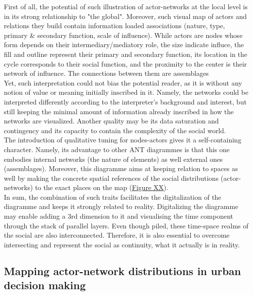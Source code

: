 \documentclass[11pt]{report}
\begin{document}
First of all, the potential of such illustration of actor-networks at the local level is in its strong relationship to "the global".
Moreover, such visual map of actors and relations they build contain information loaded associations (nature, type, primary \& secondary function, scale of influence).
While actors are nodes whose form depends on their intermediary/mediatory role, the size indicate influce, the fill and outline represent their primary and secondary function, its location in the cycle corresponds to their social function, and the proximity to the center is their network of influence.
The connections between them are assemblages
\\

Yet, such interpretation could not bias the potential reader, as it is without any notion of value or meaning initially inscribed in it.
Namely, the networks could be interpreted differently according to the interpreter's background and interest, but still keeping the minimal amount of information already inscribed in how the networks are visualized.
Another quality may be its data saturation and contingency and its capacity to contain the complexity of the social world.
\\

The introduction of qualitative tuning for nodes-actors gives it a self-containing character.
Namely, its advantage to other ANT diagrammes is that this one embodies internal  networks (the nature of elements) as well external ones (assemblages).
Moreover, this diagramme aims at keeping relation to spaces as well by making the concrete spatial references of the social distributions (actor-networks) to the exact places on the map (\href{ref}{Figure XX}).
\\

In sum, the combination of such traits facilitates the digitalization of the diagramme and keeps it strongly related to reality.
Digitalizing the diagramme  may enable adding a 3rd dimension to it and visualising the time component through the stack of parallel layers. Even though piled, these time-space realms of the social are also interconnected.
Therefore, it is also essential to overcome intersecting and represent the social as continuity, what it actually is in reality. 
  
\subsection{Mapping actor-network distributions in urban decision making}
\end{document}
